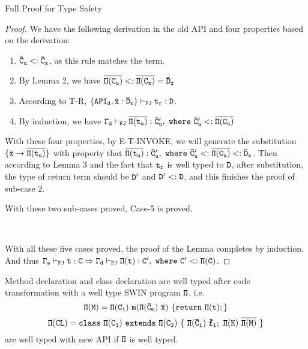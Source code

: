 \begin{section}{Full Proof for Type Safety}
\begin{proof}
We have the following derivation in the old API and four properties based on the derivation: 
\begin{center}
\noLine
{}
\DP
\end{center}

\begin{enumerate}
\item $\tt\bar{C}_u<:\bar{C}_x$, as this rule matches the term.
\item By Lemma 2, we have $\tt \overline{\Pi(C_u)} <: \overline{\Pi(C_x)} = \bar{D}_x$
\item According to T-R, $\tt \{API_d, \bar{x}:\bar{D}_x\}\vdash_{FJ}t_r:D$.
\item By induction, we have $\tt \Gamma_d\vdash_{FJ}\overline{\Pi(t_u)}:\bar{C}'_u,\ where\ \bar{C}'_u <:\overline{\Pi(C_u)}$
\end{enumerate}
With these four properties, by E-T-INVOKE, we will generate the substitution $\tt \{\bar{x}\rightarrow\overline{\Pi(t_u)}\}$ with property that $\tt \overline{\Pi(t_u)}:\bar{C}'_u,\ where\ \bar{C}'_u <: \overline{\Pi(C_u)}<:\bar{D}_x$.
Then according to Lemma 3 and the fact that $\tt t_r$ is well typed to $\tt D$, after substitution, the type of return term should be $\tt D'$ and $\tt D' <: D$, and this finishes the proof of sub-case 2.
\par
With these two sub-cases proved, Case-5 is proved.

\par
\ 
\par
With all these five cases proved, the proof of the Lemma completes by induction. And thus $\tt \Gamma_s\vdash_{FJ} t:C \Rightarrow \Gamma_d\vdash_{FJ} \Pi(t):C',\ where\ C'<:\Pi(C)$.
\end{proof}

\begin{theorem}
Method declaration and class declaration are well typed after code transformation with a well type SWIN program $\tt \Pi$. i.e.
 $$\tt\Pi(M)=\Pi(C_1)\ m(\Pi(\bar{C}_m)\ \bar{x})\ \{return\ \Pi(t);\}$$
 $$\tt \Pi(CL)= class\ \Pi(C_1)\ extends\ \Pi(C_2)\ \{\ \Pi(\bar{C}_i)\ \bar{f}_i;\ \Pi(K)\  \overline{\Pi(M)}\ \}$$
are well typed with new API if $\tt \Pi$ is well typed.
\end{theorem}


\end{section}
